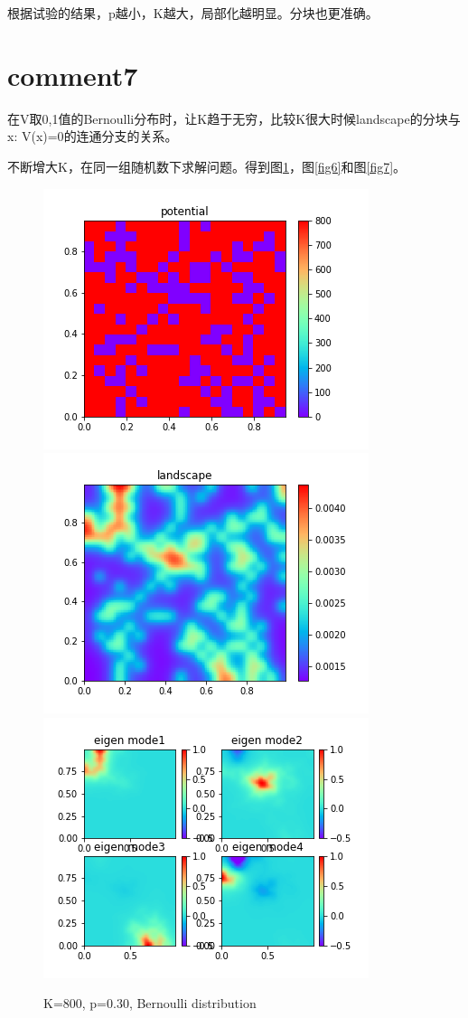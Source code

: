 \documentclass[UTF8,12pt]{article}
\begin{document}
根据试验的结果，p越小，K越大，局部化越明显。分块也更准确。

\section{comment7}

在V取{0,1}值的Bernoulli分布时，让K趋于无穷，比较K很大时候landscape的分块与{x: V(x)=0}的连通分支的关系。

不断增大K，在同一组随机数下求解问题。得到图\ref{fig5}，图\ref{fig6}和图\ref{fig7}。

\begin{figure}[htbp]
    \centering
    \includegraphics[width=0.3\linewidth]{../pics/v5}
    \includegraphics[width=0.3\linewidth]{../pics/w5}
    \includegraphics[width=0.3\linewidth]{../pics/u5}
    \caption{K=800, p=0.30, Bernoulli distribution}
    \label{fig5}
\end{figure}
\end{document}
